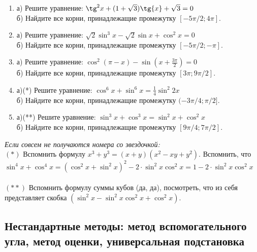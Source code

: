 \documentclass[12pt]{article}
\begin{document}
\begin{enumerate}[start=1,label={\itshape\bfseries \arabic*.}]
\item  а) Решите уравнение: $\tg^2{x} + (1 + \sqrt{3})\tg{x} + \sqrt{3} = 0$\\
б) Найдите все корни, принадлежащие промежутку $[- 5\pi / 2; 4\pi]$.

\item а) Решите уравнение: $\sqrt{2} \sin^3{x} - \sqrt{2} \sin{x} + \cos^2{x} = 0$\\
б) Найдите все корни, принадлежащие промежутку $[ - 5\pi / 2; -\pi]$.

\item  а) Решите уравнение: $\cos^2{(\pi - x)} - \sin{(x + \frac{3\pi}{2})} = 0 $\\
  б) Найдите все корни, принадлежащие промежутку $[3\pi; 9\pi / 2]$.

\item  а)(*) Решите уравнение: $\cos^6{x} + \sin^6{x} = \frac{1}{4} \sin^2{2x}$\\  б) Найдите все корни, принадлежащие промежутку $(- 3\pi /4; \pi / 2]$.

\item  а)(**) Решите уравнение: $\sin^3{x} + \cos^3{x} = \sin^2{x} + \cos^2{x}$\\
б) Найдите все корни, принадлежащие промежутку $[9\pi / 4; 7\pi / 2]$.
\end{enumerate}
\textit{Если совсем не получаются номера со звездочкой:}\\

\noindent$(*)$ Вспомнить формулу $x^3 + y^3 = (x + y)(x^2 - xy + y^2)$. Вспомнить, что $\sin^4{x} + \cos^4{x} = (\cos^2{x} + \sin^2{x})^2 - 2\cdot\sin^2{x}\cos^2{x} = 1 - 2\cdot\sin^2{x}\cos^2{x}$\\
\\
$(**)$ Вспомнить формулу суммы кубов (да, да), посмотреть, что из себя представляет  скобка $(\sin^2{x} - \sin^2{x} \cos^2{x} + \cos^2{x})$.





\subsection{Нестандартные методы: метод вспомогательного угла, метод оценки, универсальная подстановка}
\end{document}
